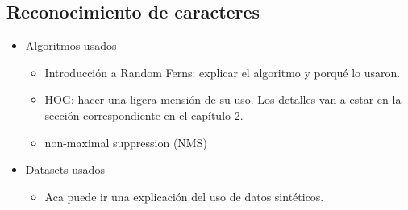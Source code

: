 \subsection{Reconocimiento de caracteres}

	\begin{itemize}
		\item Algoritmos usados
			\begin{itemize}
				\item Introducción a Random Ferns: explicar el algoritmo y porqué lo usaron.
				\item HOG: hacer una ligera mensión de su uso. Los detalles van a estar en la sección correspondiente en el capítulo 2.
				\item non-maximal suppression (NMS) 
			\end{itemize}
		\item Datasets usados 
			\begin{itemize}
				\item Aca puede ir una explicación del uso de datos sintéticos.
			\end{itemize}
	\end{itemize}